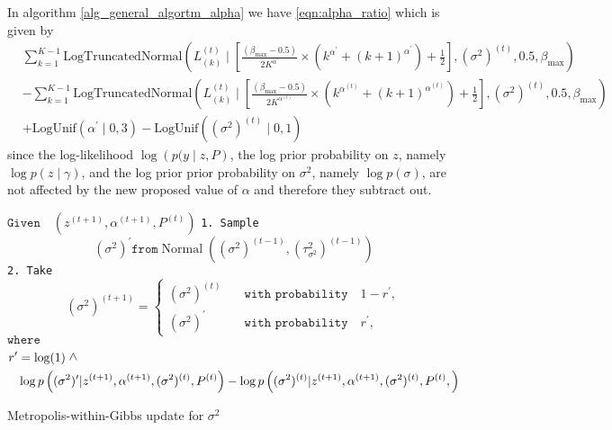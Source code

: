 \documentclass[11pt]{amsart}
\newcommand{\vertg}{\rotatebox{90}{$>$}}
\begin{document}
In algorithm \eqref{alg_general_algortm_alpha} we have \eqref{eqn:alpha_ratio} which is given by
\begin{align}
& \sum_{k=1}^{K-1} \text{LogTruncatedNormal} \left(L_{(k)}^{(t)} \mid  \left[ \frac{(\beta_{\max} - 0.5)}{2K^{\alpha^{\prime}}} \times  \left(  k^{\alpha^{\prime}} + (k+1)^{\alpha^{\prime}} \right) +\frac{1}{2} \right], (\sigma^{2})^{(t)}, 0.5, \beta_{\max}\right) \nonumber \\ 
&- \sum_{k=1}^{K-1} \text{LogTruncatedNormal}\left(L_{(k)}^{(t)} \mid \left[ \frac{(\beta_{\max} - 0.5)}{2K^{\alpha^{(t)}}} \times  \left(  k^{\alpha^{(t)}} + (k+1)^{\alpha^{(t)}} \right) +\frac{1}{2} \right], (\sigma^{2})^{(t)}, 0.5, \beta_{\max} \right) \nonumber \\  &+ \text{LogUnif}\left(\alpha^{\prime} \mid 0, 3\right) - \text{LogUnif}\left((\sigma^2)^{(t)} \mid 0, 1\right) 
\end{align}
since the log-likelihood $\log{\left(p(y\mid z,P\right)}$, the log prior probability on $z$, namely $\log{p\left(z \mid \gamma \right)}$, and the log prior prior probability on $\sigma^2$, namely $\log{p\left(\sigma \right)}$, are not affected by the new proposed value of $\alpha$ and therefore they subtract out.

\begin{algorithm}
\begin{algorithmic}[h]
\State $\texttt{Given} \quad \left( z^{(t+1)},\alpha^{(t+1)},P^{(t)} \right)  $
\State
\State \texttt{1. Sample} \begin{equation}\label{eqn_general_proposal}
(\sigma^{2})^{\prime} \texttt{from}  \operatorname{Normal}\left( (\sigma^{2})^{(t-1)}, (\tau^2_{\sigma^2})^{(t-1)} \right)
\end{equation}
\State \texttt{2. Take} \begin{equation}\label{eqn_acc_reject}
(\sigma^{2})^{(t+1)} = 
\begin{cases}
(\sigma^{2})^{(t)} \quad &\texttt{with probability} \quad 1 - r^\prime, \\
(\sigma^{2})^{\prime} \quad &\texttt{with probability} \quad r^\prime,
\end{cases}
\end{equation}
\State $\texttt{where}$ \begin{align}\label{eqn:sigma_ratio}
r^\prime &= \log(1) \ \vertg \nonumber \\ 
&\log{p \left( (\sigma^{2})^{\prime}| z^{(t+1)},\alpha^{(t+1)}, (\sigma^{2})^{(t)}, P^{(t)} \right)} 
 - \log{p\left( (\sigma^{2})^{(t)}|z^{(t+1)},\alpha^{(t+1)},(\sigma^{2})^{(t)},P^{(t)},\right)}  
\end{align}
\end{algorithmic}
\caption{Metropolis-within-Gibbs update for \( \sigma^2 \)}
\label{alg_general_algorithm_sigma}
\end{algorithm}
\end{document}
